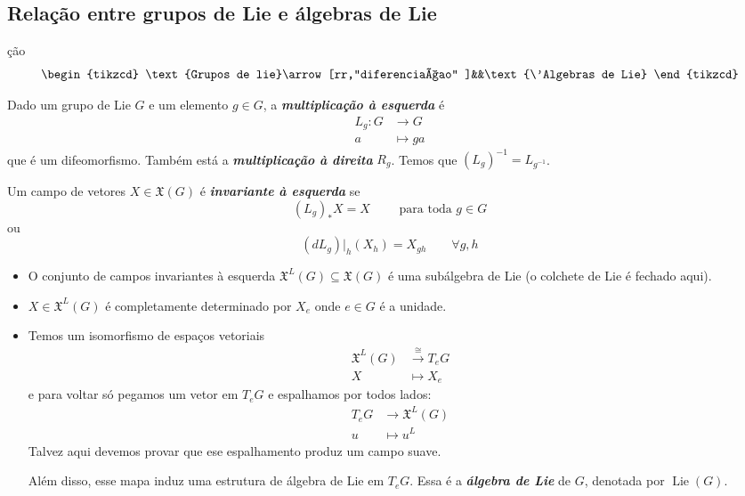 \subsection{Rela\c c\~ao entre grupos de Lie e álgebras de Lie}
\c c\~ao
\[\begin{tikzcd}
	\text{Grupos de lie}\arrow[rr,"diferenciaçao" ]&&\text{\'Algebras de Lie}  
\end{tikzcd}\]

\begin{defn}
	Dado um grupo de Lie $G$ e um elemento $g\in G$, a \textit{\textbf{multiplica\c c\~ao à esquerda}} \'e
	\begin{align*}
		L_g: G &\longrightarrow G \\
		a &\longmapsto ga
	\end{align*}
que \'e um difeomorfismo. Tamb\'em est\'a a \textit{\textbf{multiplica\c c\~ao à direita}} $R_g$. Temos que  $(L_g)^{-1}=L_{g^{-1}}$.
\end{defn}

\begin{defn}
	Um campo de vetores $X\in\mathfrak{X}(G)$ \'e \textit{\textbf{invariante à esquerda}} se  \[(L_{g})_*X=X \qquad \text{ para toda }g \in G\]
	ou
	\[(dL_g)|_{h}(X_h)=X_{gh}\qquad \forall g,h\]
\end{defn}

\begin{remark}\leavevmode 
	\begin{itemize}
	\item O conjunto de campos invariantes à esquerda $\mathfrak{X}^L(G) \subseteq \mathfrak{X}(G)$ \'e uma sub\'algebra de Lie (o colchete de Lie \'e fechado aqui).
	\item $X\in\mathfrak{X}^L(G)$ \'e completamente determinado por  $X_e$ onde  $e\in G$ \'e a unidade.

	\item Temos um isomorfismo de espaços vetoriais
		\begin{align*}
			\mathfrak{X}^L(G)  &\overset{ \cong }{\longrightarrow}T_eG\\
			X &\longmapsto X_e
		\end{align*}
		e para voltar s\'o pegamos um vetor em  $T_eG$ e espalhamos por todos lados:
\begin{align*}
	T_eG  &\longrightarrow \mathfrak{X}^L(G) \\
	u &\longmapsto u^L
\end{align*}
		Talvez aqui devemos provar que ese espalhamento produz um campo suave.

		Al\'em disso, esse mapa induz uma estrutura de \'algebra de Lie em $T_eG$. Essa  \'e a \textit{\textbf{\'algebra de Lie}} de $G$, denotada por  $\operatorname{Lie}(G)$.
			\end{itemize}
\end{remark}

